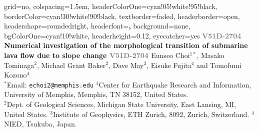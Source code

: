 \documentclass[aguposter,landscape]{baposter}
\begin{document}
\begin{poster}{
 grid=no,
 colspacing=1.5em,
 headerColorOne=cyan!05!white!95!black, %
 borderColor=cyan!30!white!90!black,
 textborder=faded,
 headerborder=open,
 headershape=roundedright,
 headerfont=\Large\sf\textbf,
 background=none,
 bgColorOne=cyan!10!white,
 headerheight=0.12\textheight,
 eyecatcher=yes
}
{
}
{\sf \Large%
  \textbf{
    \textcolor{gray}{V51D-2704 }\hspace{3em}
     {\LARGE Numerical investigation of the morphological transition of submarine lava flow due to slope change}
     \hspace{3em}\textcolor{gray}{V51D-2704 }
  }
}
{\sf %
  \vspace{0.5em} Eunseo Choi$^{1*}$, Masako Tominaga$^{2}$, Michael Grant Baker$^{2}$, Dave May$^{3}$, Eisuke Fujita$^{4}$ and Tomofumi Kozono$^{4}$ \\\vspace{0.5em}
  { \normalsize \hspace{0em} $^{*}$Email: \texttt{echoi2@memphis.edu} \quad $^{1}$Center for Earthquake Research and Information, University of Memphis, Memphis, TN 38152, United States. \\ \hspace{0em}
   $^{2}$Dept. of Geological Sciences, Michigan State University, East Lansing, MI, United States. \quad
   $^{3}$Institute of Geophysics, ETH Zurich, 8092, Zurich, Switzerland. \quad
   $^{4}$NIED, Tsukuba, Japan.
  }
}



\end{poster}
\end{document}
